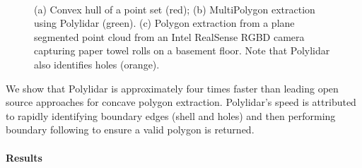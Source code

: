 \begin{figure}[ht] 
    \centering
    \label{fig:ch1_convex}\hfill
    \label{fig:ch1_concave} \hfill
    \label{fig:ch1_realsense}\hfill\\
  \caption{(a) Convex hull of a point set (red); (b) MultiPolygon extraction using Polylidar (green).
  (c) Polygon extraction from a plane segmented point cloud from an Intel RealSense RGBD camera capturing paper towel rolls on a basement floor. 
  Note that Polylidar also identifies holes (orange).}
  \label{fig:ch1_convex_concave} 
\end{figure}

We show that Polylidar is approximately four times faster than leading open source approaches for concave polygon extraction. Polylidar's speed is attributed to rapidly identifying boundary edges (shell and holes) and then performing  boundary following to ensure a valid polygon is returned. 

\paragraph{Results}


